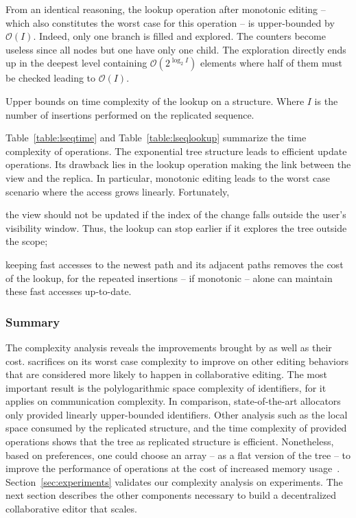 From an identical reasoning, the lookup operation after monotonic editing --
which also constitutes the worst case for this operation -- is upper-bounded by
$\mathcal{O}(I)$. Indeed, only one branch is filled and explored. The counters
become useless since all nodes but one have only one child. The exploration
directly ends up in the deepest level containing $\mathcal{O}(2^{\log_2 I})$
elements where half of them must be checked leading to
$\mathcal{O}(I)$.

\begin{table}
  \caption{\label{table:lseqlookup}
    Upper bounds on time complexity of the lookup on a \LSEQ structure.
    Where $I$ is the number of insertions performed on the replicated sequence.}
  \centering
  
\end{table}

Table~\ref{table:lseqtime} and Table~\ref{table:lseqlookup} summarize the time
complexity of operations. The exponential tree structure leads to efficient
update operations. Its drawback lies in the lookup operation making the link
between the view and the replica. In particular, monotonic editing leads to the
worst case scenario where the access grows linearly. Fortunately,
\begin{inparaenum}[(i)]
\item the view should not be updated if the index of the change falls outside
  the user's visibility window. Thus, the lookup can stop earlier if it explores
  the tree outside the scope;
\item keeping fast accesses to the newest path and its adjacent paths removes
  the cost of the lookup, for the repeated insertions -- if monotonic -- alone
  can maintain these fast accesses up-to-date.
\end{inparaenum}

\subsubsection{Summary}

The complexity analysis reveals the improvements brought by \LSEQ as well as
their cost.  \LSEQ sacrifices on its worst case complexity to improve on other
editing behaviors that are considered more likely to happen in collaborative
editing. The most important result is the polylogarithmic space complexity of
identifiers, for it applies on communication complexity. In comparison,
state-of-the-art allocators~\cite{preguica2009commutative, weiss2009logoot} only
provided linearly upper-bounded identifiers. Other analysis such as the local
space consumed by the replicated structure, and the time complexity of provided
operations shows that the tree as replicated structure is
efficient. Nonetheless, based on preferences, one could choose an array -- as a
flat version of the tree -- to improve the performance of operations at the cost
of increased memory usage~\cite{weiss2009logoot}.  Section~\ref{sec:experiments}
validates our complexity analysis on experiments. The next section describes the
other components necessary to build a decentralized collaborative editor that
scales.

